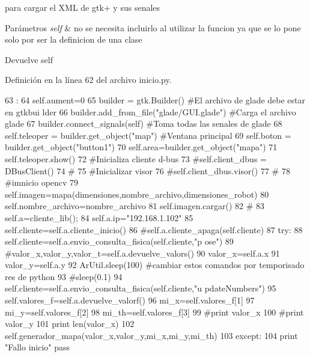 para cargar el XML de gtk+ y sus senales 


\begin{DoxyParams}{Parámetros}
{\em self} & no se necesita incluirlo al utilizar la funcion ya que se lo pone solo por ser la definicion de una clase \\
\hline
\end{DoxyParams}
\begin{DoxyReturn}{Devuelve}
self 
\end{DoxyReturn}


Definición en la línea 62 del archivo inicio.py.


\begin{DoxyCode}
63                                                                        :
64                 self.aument=0
65                 builder = gtk.Builder() #El archivo de glade debe estar en gtkbui
      lder
66                 builder.add_from_file("glade/GUI.glade") #Carga el archivo glade
67                 builder.connect_signals(self) #Toma todas las senales de glade
68                 self.teleoper = builder.get_object("map") #Ventana principal
69                 self.boton = builder.get_object("button1")
70                 self.area=builder.get_object("mapa")
71                 self.teleoper.show()
72                 #Inicializa cliente d-bus
73                 #self.client_dbus = DBusClient()
74                 #
75                 #Inicializar visor
76                 #self.client_dbus.visor()
77                 #
78                 #imnicio opencv
79                 self.imagen=mapa(dimensiones,nombre_archivo,dimensiones_robot)
80                 self.nombre_archivo=nombre_archivo
81                 self.imagen.cargar()
82                 #
83                 self.a=cliente_lib();
84                 self.a.ip="192.168.1.102"
85                 self.cliente=self.a.cliente_inicio()
86                 #self.a.cliente_apaga(self.cliente)
87                 try:
88                         self.cliente=self.a.envio_consulta_fisica(self.cliente,"p
      ose")
89                         #valor_x,valor_y,valor_t=self.a.devuelve_valors()
90                         valor_x=self.a.x
91                         valor_y=self.a.y
92                         ArUtil.sleep(100) #cambiar estos comandos por temporisado
      res de python
93                         #sleep(0.1)
94                         self.cliente=self.a.envio_consulta_fisica(self.cliente,"u
      pdateNumbers")
95                         self.valores_f=self.a.devuelve_valorf()
96                         mi_x=self.valores_f[1]
97                         mi_y=self.valores_f[2]
98                         mi_th=self.valores_f[3]
99                         #print valor_x
100                         #print valor_y
101                         print len(valor_x)
102                         self.generador_mapa(valor_x,valor_y,mi_x,mi_y,mi_th)
103                 except:
104                         print "Fallo inicio"
                        pass
\end{DoxyCode}


